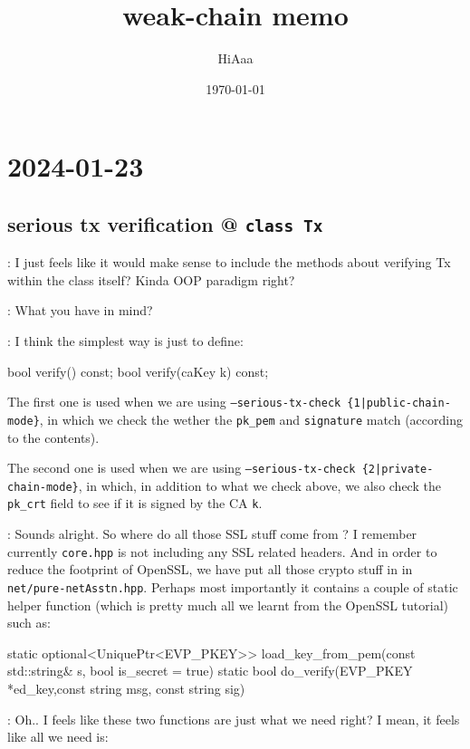 \documentclass[dvipsnames]{article}
\title{weak-chain memo}
\date{\today}
\author{HiAaa}
\begin{document}
\maketitle
\tableofcontents{}
\newpage{}

\section*{2024-01-23}

\subsection*{serious tx verification @ \texttt{class Tx} }
 : I just feels like it would make sense to include the methods
about verifying Tx within the class  itself? Kinda OOP paradigm right?

 : What you have in mind?

 : I think the simplest way is just to define:

\begin{simplec}
bool verify() const;
bool verify(caKey k) const;
\end{simplec}

The first one is used when we are using \texttt{--serious-tx-check
  \{1|public-chain-mode\}}, in which we check the wether the \texttt{pk\_pem}
and \texttt{signature} match (according to the contents).

The second one is used when we are using \texttt{--serious-tx-check
  \{2|private-chain-mode\}}, in which, in addition to what we check above, we
also check the \texttt{pk\_crt} field to see if it is signed by the CA \texttt{k}.

 : Sounds alright. So where do all those SSL stuff come from ? I
remember currently \texttt{core.hpp} is not including any SSL related headers.
And in order to reduce the footprint of OpenSSL, we have put all those crypto
stuff in  in \texttt{net/pure-netAsstn.hpp}. Perhaps most
importantly it contains a couple of static helper function (which is pretty much
all we learnt from the OpenSSL tutorial) such as:
\begin{simplec}
static optional<UniquePtr<EVP_PKEY>> load_key_from_pem(const std::string& s, bool is_secret = true)
static bool do_verify(EVP_PKEY *ed_key,const string msg, const string sig)
\end{simplec}

 : Oh.. I feels like these two functions are just what we need
right? I mean, it feels like all we need is:
\end{document}
